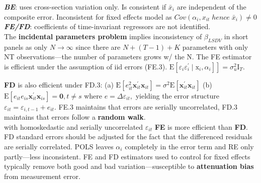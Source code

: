 \documentclass[
]{article}
\begin{document}
\textbf{\emph{BE}}: uses cross-section variation only. Is consistent if
\(\bar x_i\) are independent of the composite error. Inconsistent for
fixed effects model as
\(Cov(\alpha_i, x_{it} \; hence \; \bar x_{i}) \neq 0\)\\

\textbf{\emph{FE/FD}}: coefficients of time-invariant regressors are not
identified.\\
The \textbf{incidental parameters problem} implies inconsistency of
\(\beta_{LSDV}\) in short panels as only \(N \to \infty\) since there
are \(N + (T-1) + K\) parameters with only NT observations---the number
of parameters grows w/ the N. The FE estimator is efficient under the
assumption of iid errors (FE.3).
\(\left.\mathrm{E}\left[\varepsilon_{i} \varepsilon_{i}^{\prime} \mid \mathrm{x}_{i}, \alpha_{i}\right]\right]=\sigma_{u}^{2} \mathrm{I}_{T}\).

\textbf{FD} is also efficient under FD.3: (a)
\(\mathrm{E}\left[e_{i t}^{2} \mathbf{x}_{i t}^{\prime} \mathbf{x}_{i t}\right]=\sigma^{2} \mathrm{E}\left[\mathbf{x}_{i t}^{\prime} \mathbf{x}_{i t}\right]\)
(b)
\(\mathrm{E}\left[e_{i t} e_{i s} \mathbf{x}_{i t}^{\prime} \mathbf{x}_{i s}\right]=\mathbf{0}, t \neq s\)
where \(e=\Delta \varepsilon_{i t},\) yielding the error structure
\(\varepsilon_{i t}=\varepsilon_{i, t-1}+e_{i t}\). FE.3 maintains that
errors are serially uncorrelated, FD.3 maintains that errors follow a
\textbf{random walk}.\\
with homoskedastic and serially uncorrelated \(\varepsilon_{it}\)
\textbf{FE} is more efficient than \textbf{FD}. FD standard errors
should be adjusted for the fact that the differenced residuals are
serially correlated. POLS leaves \(\alpha_i\) completely in the error
term and RE only partly---less inconsistent. FE and FD estimators used
to control for fixed effects typically remove both good and bad
variation---susceptible to \textbf{attenuation bias} from measurement
error.
\end{document}
